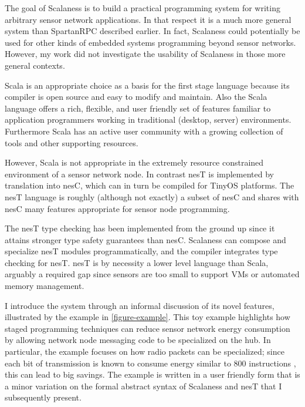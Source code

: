 The goal of Scalaness is to build a practical programming system for writing arbitrary sensor
network applications. In that respect it is a much more general system than SpartanRPC described
earlier. In fact, Scalaness could potentially be used for other kinds of embedded systems
programming beyond sensor networks. However, my work did not investigate the usability of
Scalaness in those more general contexts.

Scala is an appropriate choice as a basis for the first stage language because its compiler is
open source and easy to modify and maintain. Also the Scala language offers a rich, flexible,
and user friendly set of features familiar to application programmers working in traditional
(desktop, server) environments. Furthermore Scala has an active user community with a growing
collection of tools and other supporting resources.

However, Scala is not appropriate in the extremely resource constrained environment of a sensor
network node. In contrast nesT is implemented by translation into nesC, which can in turn be
compiled for TinyOS platforms. The nesT language is roughly (although not exactly) a subset of
nesC and shares with nesC many features appropriate for sensor node programming.

The nesT type checking has been implemented from the ground up since it attains stronger type
safety guarantees than nesC. Scalaness can compose and specialize nesT modules programmatically,
and the compiler integrates type checking for nesT. nesT is by necessity a lower level language
than Scala, arguably a required gap since sensors are too small to support VMs or automated
memory management.

I introduce the system through an informal discussion of its novel features, illustrated by the
example in \autoref{figure-example}. This toy example highlights how staged programming
techniques can reduce sensor network energy consumption by allowing network node messaging code
to be specialized on the hub. In particular, the example focuses on how radio packets can be
specialized; since each bit of transmission is known to consume energy similar to 800
instructions \cite{tag}, this can lead to big savings. The example is written in a user friendly
form that is a minor variation on the formal abstract syntax of Scalaness and nesT that I
subsequently present.

